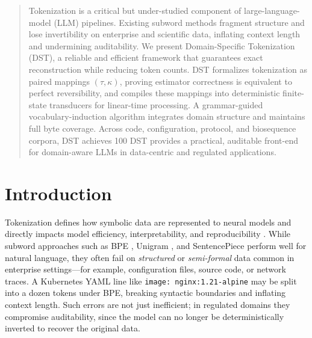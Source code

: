 \begin{abstract}
Tokenization is a critical but under-studied component of large-language-model (LLM) pipelines.
Existing subword methods fragment structure and lose invertibility on enterprise and scientific data, inflating context length and undermining auditability.
We present Domain-Specific Tokenization (DST), a reliable and efficient framework that guarantees exact reconstruction while reducing token counts.
DST formalizes tokenization as paired mappings $(\tau,\kappa)$, proving estimator correctness is equivalent to perfect reversibility, and compiles these mappings into deterministic finite-state transducers for linear-time processing.
A grammar-guided vocabulary-induction algorithm integrates domain structure and maintains full byte coverage.
Across code, configuration, protocol, and biosequence corpora, DST achieves 100 %
DST provides a practical, auditable front-end for domain-aware LLMs in data-centric and regulated applications.
\end{abstract}

\maketitle

\section{Introduction}
\label{sec:intro}

Tokenization defines how symbolic data are represented to neural models and directly impacts model efficiency, interpretability, and reproducibility \citep{Xue2022ByT5, Ding2023ByteLevelTradeoff}.
While subword approaches such as BPE \citep{Sennrich2016BPE}, Unigram \citep{Kudo2018Unigram}, and SentencePiece \citep{KudoRichardson2018SentencePiece} perform well for natural language, they often fail on \emph{structured} or \emph{semi-formal} data common in enterprise settings---for example, configuration files, source code, or network traces.
A Kubernetes YAML line like \texttt{image: nginx:1.21-alpine} may be split into a dozen tokens under BPE, breaking syntactic boundaries and inflating context length.
Such errors are not just inefficient; in regulated domains they compromise auditability, since the model can no longer be deterministically inverted to recover the original data.

